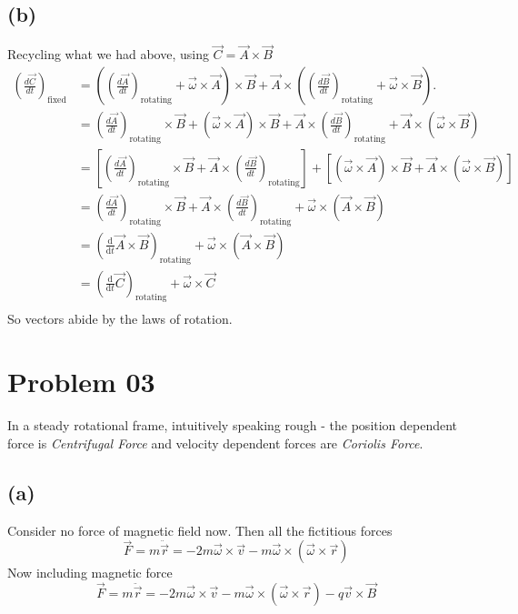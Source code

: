 \documentclass[letter, 10pts]{article}
\begin{document}
\subsection*{(b)}
Recycling what we had above, using $\vec{C} = \vec{A} \times \vec{B}$ 
\begin{align*}
	\left( \frac{d\vec{C}}{dt} \right)_{\text{fixed}} &= \left( \left( \frac{d\vec{A}}{dt} \right)_{\text{rotating}} + \vec{\omega} \times \vec{A} \right) \times \vec{B} + \vec{A} \times \left( \left( \frac{d\vec{B}}{dt} \right)_{\text{rotating}} + \vec{\omega} \times \vec{B} \right).
\\
							  &= \left( \frac{d\vec{A}}{dt} \right)_{\text{rotating}} \times \vec{B} + (\vec{\omega} \times \vec{A}) \times \vec{B} + \vec{A} \times \left( \frac{d\vec{B}}{dt} \right)_{\text{rotating}} + \vec{A} \times (\vec{\omega} \times \vec{B})
							  \\ &= 
							  \left[ \left( \frac{d\vec{A}}{dt} \right)_{\text{rotating}} \times \vec{B} + \vec{A} \times \left( \frac{d\vec{B}}{dt} \right)_{\text{rotating}} \right] + \left[ (\vec{\omega} \times \vec{A}) \times \vec{B} + \vec{A} \times (\vec{\omega} \times \vec{B}) \right]
\\
							     &= \left( \frac{d\vec{A}}{dt} \right)_{\text{rotating}} \times \vec{B} + \vec{A} \times \left( \frac{d\vec{B}}{dt} \right)_{\text{rotating}} + \vec{\omega} \times (\vec{A} \times \vec{B}) \tag{check appendix for proof}\\
							     &= \left( \frac{\mathrm{d} }{\mathrm{d} t} \vec{A} \times \vec{B} \right)_{\text{rotating}} + \vec{\omega} \times (\vec{A} \times \vec{B}) \\ 
							     &= 
							     \left(\frac{\mathrm{d} }{\mathrm{d} t} \vec{C}\right)_\text{rotating} + \vec{\omega} \times \vec{C}\\
\end{align*}
So vectors abide by the laws of rotation. 







\section*{Problem 03}
In a  steady rotational frame, intuitively speaking rough - the position dependent force is \emph{Centrifugal Force} and velocity dependent forces are  \emph{Coriolis Force}.  

\subsection*{(a)}
Consider no force of magnetic field now. Then all the fictitious forces
\[
\vec{F}  = m \ddot{\vec{r}}= - 2m  \vec{\omega} \times \vec{v} 
- m \vec{\omega} \times (\vec{\omega} \times \vec{r})
\] 
Now including magnetic force
\[\boxed{
\vec{F}  = m \ddot{\vec{r}}= - 2m  \vec{\omega} \times \vec{v} 
- m \vec{\omega} \times (\vec{\omega} \times \vec{r})
- q \vec{v} \times \vec{B}
} \] 
\end{document}
